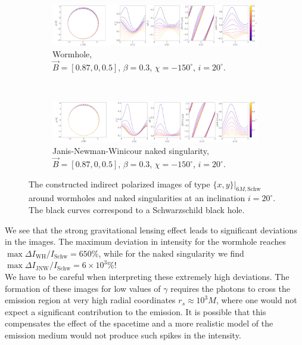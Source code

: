 \documentclass[12pt]{article}
\numberwithin{equation}{section}
\numberwithin{figure}{section}
\begin{document}
	\begin{figure}[!htb]
		\begin{subfigure}{16cm}
			\hspace{-1.0em}
			\includegraphics[scale = 0.15]{Section_7_Polarized_Emission/WH_delta_fig_B_0.87_0.5_0_20_deg_r6_n1.png}
			\caption{Wormhole,\\ $\vec{B} = [0.87, 0, 0.5]$, $\beta = 0.3$, $\chi = -150^\circ$, $i = 20^\circ$.} 
		\end{subfigure}\\
		\begin{subfigure}{17cm}
			\hspace{-1.0em}
			\includegraphics[scale = 0.15]{Section_7_Polarized_Emission/JNW_delta_fig_B_0.87_0.5_0_20_deg_r6_n1.png}
			\caption{Janis-Newman-Winicour naked singularity,\\  $\vec{B} = [0.87, 0, 0.5]$, $\beta = 0.3$, $\chi = -150^\circ$, $i = 20^\circ$.}
		\end{subfigure}
		\caption[The polarized indirect images around wormholes and naked singularities for an equatorial magnetic field at $i = 20^\circ$.]{\small The constructed indirect polarized images of type $\{x,y\}\vert_{6M, \text{Schw}}$ around wormholes and naked singularities at an inclination $i = 20^\circ$. The black curves correspond to a Schwarzschild black hole.} 
		\label{Inirect_image_deltas_20}
	\end{figure}
	
	We see that the strong gravitational lensing effect leads to significant deviations in the images. The maximum deviation in intensity for the wormhole reaches $\max \Delta I_\text{WH} / I_{\text{Schw}} = 650\%$, while for the naked singularity we find$\max \Delta I_\text{JNW} / I_{\text{Schw}} = 6\times10^3\%$!\\
	
	We have to be careful when interpreting these extremely high deviations. The formation of these images for low values of $\gamma$ requires the photons to cross the emission region at very high radial coordinates $r_s\approx 10^3M$, where one would not expect a significant contribution to the emission. It is possible that this compensates the effect of the spacetime and a more realistic model of the emission medium would not produce such spikes in the intensity.\\
	
\end{document}
